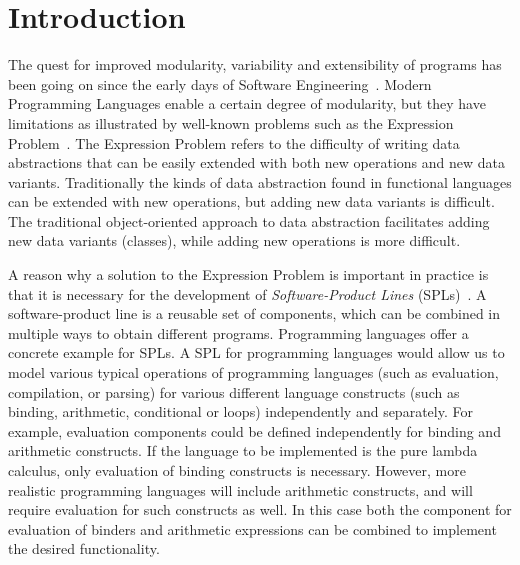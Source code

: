 \section{Introduction}\label{sec:introduction}
 
The quest for improved modularity, variability and extensibility of
programs has been going on since the early days of Software
Engineering~\cite{}. Modern Programming Languages enable a certain
degree of modularity, but they have limitations as illustrated by
well-known problems such as the Expression Problem~\cite{}. The
Expression Problem refers to the difficulty of writing data
abstractions that can be easily extended with both new operations and
new data variants. Traditionally the kinds of data abstraction found
in functional languages can be extended with new operations, but
adding new data variants is difficult. The traditional object-oriented
approach to data abstraction facilitates adding new data variants
(classes), while adding new operations is more difficult.

A reason why a solution to the Expression Problem is important in
practice is that it is necessary for the development of
\emph{Software-Product Lines} (SPLs)~\cite{}. A software-product line
is a reusable set of components, which can be combined in multiple ways
to obtain different programs. Programming languages offer a concrete
example for SPLs. A SPL for programming languages would allow us to
model various typical operations of programming languages (such as
evaluation, compilation, or parsing) for various different language
constructs (such as binding, arithmetic, conditional or loops)
independently and separately. For example, evaluation components could be defined
independently for binding and arithmetic constructs. If the language
to be implemented is the pure lambda calculus, only evaluation of
binding constructs is necessary. However, more realistic programming
languages will include arithmetic constructs, and will require 
evaluation for such constructs as well. In this case 
both the component for evaluation of binders and arithmetic 
expressions can be combined to implement the desired functionality.

